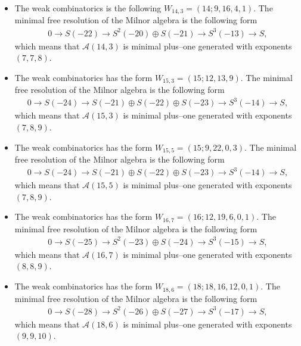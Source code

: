 \documentclass[12pt]{article}
\theoremstyle{plain}
\theoremstyle{definition}
\begin{document}
\begin{itemize}
\item[$\mathcal{A}(14,3): $] The weak combinatorics is the following $W_{14,3} = (14;9, 16, 4, 1)$. The minimal free resolution of the Milnor algebra is the following form
\begin{align*}
0\rightarrow S(-22) \rightarrow S^{2}(-20)\oplus S(-21) \rightarrow S^{3}(-13) \rightarrow S,       
\end{align*}
 which means that $\mathcal{A}(14,3)$ is minimal plus--one generated with exponents $(7,7,8)$.

 \item[$\mathcal{A}(15,3): $] The weak combinatorics has the form $W_{15,3} = (15; 12,13,9)$. The minimal free resolution of the Milnor algebra is the following form
\begin{align*}  
0\rightarrow S(-24)\rightarrow S(-21)\oplus S(-22) \oplus S(-23) \rightarrow S^{3}(-14) \rightarrow S,
\end{align*}
 which means that $\mathcal{A}(15,3)$ is minimal plus--one generated with exponents $(7,8,9)$.

\item[$\mathcal{A}(15,5): $] The weak combinatorics has the form $W_{15,5} = (15; 9,22,0,3)$. The minimal free resolution of the Milnor algebra is the following form
\begin{align*}
       0\rightarrow S(-24)\rightarrow S(-21)\oplus S(-22)\oplus S(-23) \rightarrow S^{3}(-14) \rightarrow S,
\end{align*}
 which means that $\mathcal{A}(15,5)$ is minimal plus--one generated with exponents $(7,8,9)$.
 
 \item[$\mathcal{A}(16,7): $] The weak combinatorics has the form $W_{16,7} = (16;12,19,6,0,1)$. The minimal free resolution of the Milnor algebra is the following form
\begin{align*}
       0\rightarrow S(-25)\rightarrow S^{2}(-23)\oplus S(-24) \rightarrow S^{3}(-15) \rightarrow S,
\end{align*}
 which means that $\mathcal{A}(16,7)$ is minimal plus--one generated with exponents $(8,8,9)$.

  \item[$\mathcal{A}(18,6): $] The weak combinatorics has the form $W_{18,6} = (18;18,16,12,0,1)$. The minimal free resolution of the Milnor algebra is the following form
\begin{align*}
       0\rightarrow S(-28)\rightarrow S^{2}(-26)\oplus S(-27) \rightarrow S^{3}(-17) \rightarrow S,
\end{align*}
 which means that $\mathcal{A}(18,6)$ is minimal plus--one generated with exponents $(9,9,10)$.


\end{itemize}
\end{document}
